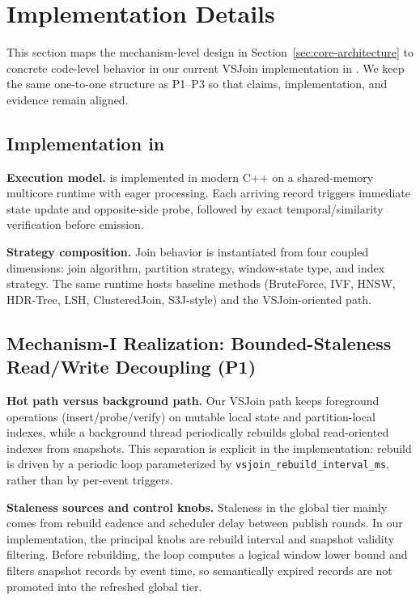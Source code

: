 \section{Implementation Details}
\label{sec:implementation-details}

This section maps the mechanism-level design in Section~\ref{sec:core-architecture} to concrete code-level behavior in our current VSJoin implementation in \system. We keep the same one-to-one structure as P1--P3 so that claims, implementation, and evidence remain aligned.

\subsection{Implementation in \system}

\textbf{Execution model.}
\system is implemented in modern C++ on a shared-memory multicore runtime with eager processing. Each arriving record triggers immediate state update and opposite-side probe, followed by exact temporal/similarity verification before emission.

\textbf{Strategy composition.}
Join behavior is instantiated from four coupled dimensions: join algorithm, partition strategy, window-state type, and index strategy. The same runtime hosts baseline methods (BruteForce, IVF, HNSW, HDR-Tree, LSH, ClusteredJoin, S3J-style) and the VSJoin-oriented path.

\subsection{Mechanism-I Realization: Bounded-Staleness Read/Write Decoupling (P1)}

\textbf{Hot path versus background path.}
Our VSJoin path keeps foreground operations (insert/probe/verify) on mutable local state and partition-local indexes, while a background thread periodically rebuilds global read-oriented indexes from snapshots. This separation is explicit in the implementation: rebuild is driven by a periodic loop parameterized by \texttt{vsjoin\_rebuild\_interval\_ms}, rather than by per-event triggers.

\textbf{Staleness sources and control knobs.}
Staleness in the global tier mainly comes from rebuild cadence and scheduler delay between publish rounds. In our implementation, the principal knobs are rebuild interval and snapshot validity filtering. Before rebuilding, the loop computes a logical window lower bound and filters snapshot records by event time, so semantically expired records are not promoted into the refreshed global tier.

